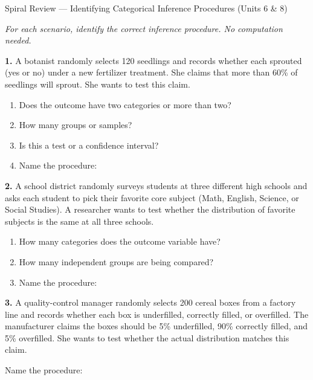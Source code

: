 \documentclass[10pt]{article}
\begin{document}
\namedateperiod

\vspace{0.12in}

\begin{notesbox}{Spiral Review --- Identifying Categorical Inference Procedures (Units 6 \& 8)}

\textit{For each scenario, identify the correct inference procedure. No computation needed.}

\vspace{0.06in}
\textbf{1.} A botanist randomly selects 120 seedlings and records whether each sprouted
(yes or no) under a new fertilizer treatment. She claims that more than 60\% of seedlings
will sprout. She wants to test this claim.

\begin{enumerate}[label=\alph*.]
  \item Does the outcome have two categories or more than two? \blank{4cm}
  \item How many groups or samples? \blank{3cm}
  \item Is this a test or a confidence interval? \blank{3cm}
  \item Name the procedure: \blank{8cm}
\end{enumerate}

\vspace{0.10in}
\textbf{2.} A school district randomly surveys students at three different high schools and
asks each student to pick their favorite core subject (Math, English, Science, or Social
Studies). A researcher wants to test whether the distribution of favorite subjects is the
same at all three schools.

\begin{enumerate}[label=\alph*.]
  \item How many categories does the outcome variable have? \blank{3cm}
  \item How many independent groups are being compared? \blank{3cm}
  \item Name the procedure: \blank{8cm}
\end{enumerate}

\vspace{0.10in}
\textbf{3.} A quality-control manager randomly selects 200 cereal boxes from a factory line and
records whether each box is underfilled, correctly filled, or overfilled. The manufacturer
claims the boxes should be 5\% underfilled, 90\% correctly filled, and 5\% overfilled. She
wants to test whether the actual distribution matches this claim.

Name the procedure: \blank{9cm}

\end{notesbox}
\end{document}
